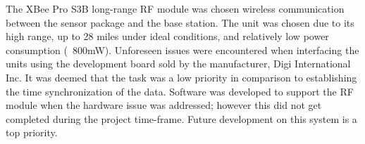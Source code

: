 The XBee Pro S3B long-range RF module was chosen wireless communication between the sensor package and the base station.
The unit was chosen due to its high range, up to 28 miles under ideal conditions, and relatively low power consumption (~800mW).
Unforeseen issues were encountered when interfacing the units using the development board sold by the manufacturer, Digi International Inc.
It was deemed that the task was a low priority in comparison to establishing the time synchronization of the data.
Software was developed to support the RF module when the hardware issue was addressed; however this did not get completed during the project time-frame. 
Future development on this system is a top priority.